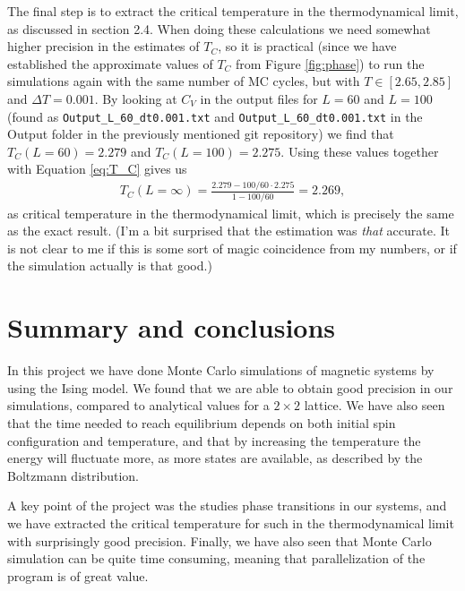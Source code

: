\documentclass[12pt, a4paper]{article}
\begin{document}
The final step is to extract the critical temperature in the thermodynamical limit, as discussed in 
section 2.4. When doing these calculations we need somewhat higher precision in the estimates of 
$T_C$, so it is practical (since we have established the approximate values of $T_C$ from Figure
\ref{fig:phase}) to run the simulations again with the same number of MC cycles, but with 
$T\in [2.65,2.85]$ and $\Delta T = 0.001$. By looking at $C_V$ in the output files for $L=60$ and $L=100$
(found as \texttt{Output\_L\_60\_dt0.001.txt} and \texttt{Output\_L\_60\_dt0.001.txt} in the 
Output folder in the previously mentioned git repository) we find that $T_C(L=60)=2.279$ and 
$T_C(L=100)=2.275$. Using these values together with Equation \ref{eq:T_C} gives us 
\begin{align*}
T_C(L=\infty) = \frac{2.279 - 100/60\cdot 2.275}{1- 100/60} = 2.269, 
\end{align*}
as critical temperature in the thermodynamical limit, 
which is precisely the same as the exact result. (I'm a bit surprised that the estimation was \textit{that}
accurate. It is not clear to me if this is some sort of magic coincidence from my numbers, or if 
the simulation actually is that good.) 

\section{Summary and conclusions}

In this project we have done Monte Carlo simulations of magnetic systems by using the Ising model. We 
found that we are able to obtain good precision in our simulations, compared to analytical values 
for a $2\times 2$ lattice. We have also seen that the time needed to reach equilibrium depends on both 
initial spin configuration and temperature, and that by increasing the temperature the energy will 
fluctuate more, as more states are available, as described by the Boltzmann distribution. 

A key point of the project was the studies phase transitions in our systems, and we have extracted 
the critical temperature for such in the thermodynamical limit with surprisingly good precision. 
Finally, we have also seen that Monte Carlo simulation can be quite time consuming, meaning that
parallelization of the program is of great value. 
\end{document}
